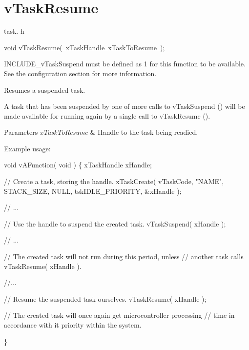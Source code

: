 \hypertarget{group__v_task_resume}{}\section{v\+Task\+Resume}
\label{group__v_task_resume}
task. h 
\begin{DoxyPre}void \mbox{\hyperlink{task_8h_a70d003c5360a01fa0f7f19859cc2d907}{vTaskResume( xTaskHandle xTaskToResume )}};\end{DoxyPre}


I\+N\+C\+L\+U\+D\+E\+\_\+v\+Task\+Suspend must be defined as 1 for this function to be available. See the configuration section for more information.

Resumes a suspended task.

A task that has been suspended by one of more calls to v\+Task\+Suspend () will be made available for running again by a single call to v\+Task\+Resume ().


\begin{DoxyParams}{Parameters}
{\em x\+Task\+To\+Resume} & Handle to the task being readied.\\
\hline
\end{DoxyParams}
Example usage\+: 
\begin{DoxyPre}
void vAFunction( void )
\{
xTaskHandle xHandle;
\begin{DoxyVerb}// Create a task, storing the handle.
xTaskCreate( vTaskCode, "NAME", STACK_SIZE, NULL, tskIDLE_PRIORITY, &xHandle );

// ...

// Use the handle to suspend the created task.
vTaskSuspend( xHandle );

// ...

// The created task will not run during this period, unless
// another task calls vTaskResume( xHandle ).

//...


// Resume the suspended task ourselves.
vTaskResume( xHandle );

// The created task will once again get microcontroller processing
// time in accordance with it priority within the system.
\end{DoxyVerb}

\}
  \end{DoxyPre}
 